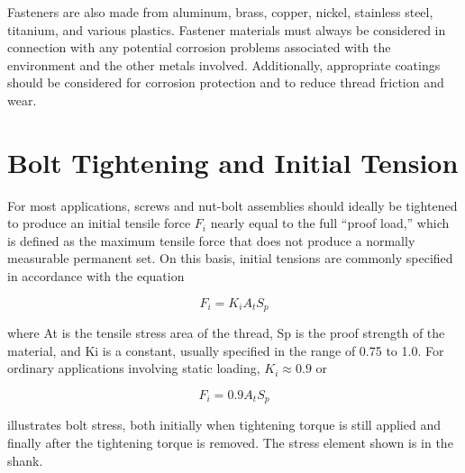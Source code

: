 \documentclass[
10pt,
a4paper,
openany,
svgnames,
]{book}
\begin{document}
Fasteners are also made from aluminum, brass, copper, nickel, stainless steel, titanium, and various plastics. Fastener materials must always be considered in connection with any potential corrosion problems associated with the environment and the other metals involved. Additionally, appropriate coatings should be considered for corrosion protection and to reduce thread friction and wear.

\section{Bolt Tightening and Initial Tension}

For most applications, screws and nut-bolt assemblies should ideally be tightened to produce an initial tensile force $F_i$ nearly equal to the full “proof load,” which is defined as the maximum tensile force that does not produce a normally measurable permanent set. On this basis, initial tensions are commonly specified in accordance with the equation

\[F_i = K_iA_tS_p\]

where At is the tensile stress area of the thread, Sp is the proof strength of the material, and Ki is a constant, usually specified in the range of 0.75 to 1.0. For ordinary applications involving static loading, $K_i \approx 0.9$ or

\begin{equation}
  F_i = 0.9A_tS_p
\end{equation}

 illustrates bolt stress, both initially when tightening torque is still applied and finally after the tightening torque is removed. The stress element shown is in the shank.
\end{document}

